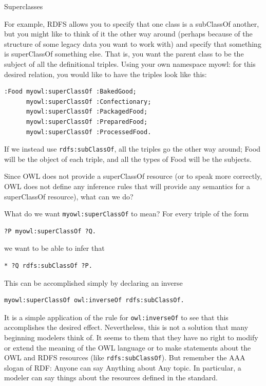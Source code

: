 \begin{challenge}{Superclasses}

For example, RDFS allows you to specify that one class is a subClassOf
another, but you might like to think of it the other way around (perhaps
because of the structure of some legacy data you want to work with) and
specify that something is superClassOf something else. That is, you want
the parent class to be the subject of all the definitional triples.
Using your own namespace myowl: for this desired relation, you would
like to have the triples look like this:

\begin{lstlisting}
:Food myowl:superClassOf :BakedGood; 
      myowl:superClassOf :Confectionary;
      myowl:superClassOf :PackagedFood;
      myowl:superClassOf :PreparedFood;
      myowl:superClassOf :ProcessedFood.
\end{lstlisting}

If we instead use \texttt{rdfs:subClassOf}, all the triples go the other way
around; Food will be the object of each triple, and all the types of
Food will be the subjects.

Since OWL does not provide a superClassOf resource (or to speak more
correctly, OWL does not define any inference rules that will provide any
semantics for a superClassOf resource), what can we do?

\solution

What do we want \texttt{myowl:superClassOf} to mean? For every triple of the form

\begin{lstlisting}
?P myowl:superClassOf ?Q.
\end{lstlisting}

we want to be able to infer that

\begin{lstlisting}
* ?Q rdfs:subClassOf ?P.
\end{lstlisting}

This can be accomplished simply by declaring an inverse

\begin{lstlisting}
myowl:superClassOf owl:inverseOf rdfs:subClassOf.
\end{lstlisting}

It is a simple application of the rule for \texttt{owl:inverseOf} to see that
this accomplishes the desired effect. Nevertheless, this is not a
solution that many beginning modelers think of. It seems to them that
they have no right to modify or extend the meaning of the OWL language
or to make statements about the OWL and RDFS resources (like
\texttt{rdfs:subClassOf}). But remember the AAA slogan of RDF: Anyone can say
Anything about Any topic. In particular, a modeler can say things about
the resources defined in the standard.


\end{challenge}
